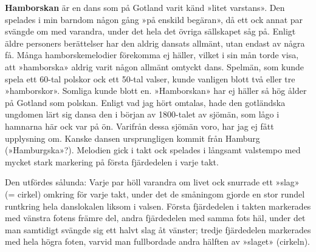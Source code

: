 \thispagestyle{empty}
\vspace*{5cm}
\begin{adjustwidth*}{30mm}{30mm}
\setlength{\parindent}{1.5em}

\textbf{Hamborskan} är en dans som på Gotland varit känd
»litet varstans». Den spelades i min barndom någon gång
»på enskild begäran», då ett ock annat par svängde om med
varandra, under det hela det övriga sällskapet såg på. Enligt
äldre personers berättelser har den aldrig dansats allmänt,
utan endast av några få. Många hamborskemelodier förekomma
ej häller, vilket i sin mån torde visa, att »hamborska»
aldrig varit någon allmänt omtyckt dans. Spelmän,
som kunde spela ett 60-tal polskor ock
ett 50-tal valser, kunde vanligen blott
två eller tre »hamborskor». Somliga kunde blott en. »Hamborskan» har ej
häller så hög ålder på Gotland som polskan. Enligt vad jag hört omtalas,
hade den gotländska ungdomen lärt sig dansa den i början av 1800-talet av sjömän, som lågo i
hamnarna här ock var på ön. Varifrån dessa sjömän voro, har jag ej fått upplysning om.
Kanske dansen ursprungligen kommit från Hamburg (»Hamburgska»?). Melodien gick i 
takt ock spelades i långsamt valstempo med mycket stark markering på första fjärdedelen i varje takt.

Den utfördes sålunda: Varje par höll varandra om livet
ock snurrade ett »slag» (= cirkel) omkring för varje takt,
under det de småningom gjorde en stor rundel runtkring
hela danslokalen liksom i valsen. Första fjärdedelen i takten
markerades med vänstra fotens främre del, andra fjärdedelen
med samma fots häl, under det man samtidigt svängde sig
ett halvt slag åt vänster; tredje fjärdedelen markerades med
hela högra foten, varvid man fullbordade andra hälften av
»slaget» (cirkeln).
\end{adjustwidth*}

